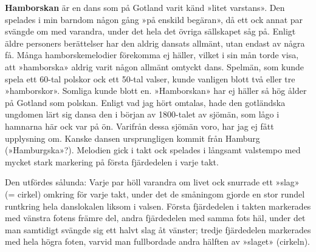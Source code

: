 \thispagestyle{empty}
\vspace*{5cm}
\begin{adjustwidth*}{30mm}{30mm}
\setlength{\parindent}{1.5em}

\textbf{Hamborskan} är en dans som på Gotland varit känd
»litet varstans». Den spelades i min barndom någon gång
»på enskild begäran», då ett ock annat par svängde om med
varandra, under det hela det övriga sällskapet såg på. Enligt
äldre personers berättelser har den aldrig dansats allmänt,
utan endast av några få. Många hamborskemelodier förekomma
ej häller, vilket i sin mån torde visa, att »hamborska»
aldrig varit någon allmänt omtyckt dans. Spelmän,
som kunde spela ett 60-tal polskor ock
ett 50-tal valser, kunde vanligen blott
två eller tre »hamborskor». Somliga kunde blott en. »Hamborskan» har ej
häller så hög ålder på Gotland som polskan. Enligt vad jag hört omtalas,
hade den gotländska ungdomen lärt sig dansa den i början av 1800-talet av sjömän, som lågo i
hamnarna här ock var på ön. Varifrån dessa sjömän voro, har jag ej fått upplysning om.
Kanske dansen ursprungligen kommit från Hamburg (»Hamburgska»?). Melodien gick i 
takt ock spelades i långsamt valstempo med mycket stark markering på första fjärdedelen i varje takt.

Den utfördes sålunda: Varje par höll varandra om livet
ock snurrade ett »slag» (= cirkel) omkring för varje takt,
under det de småningom gjorde en stor rundel runtkring
hela danslokalen liksom i valsen. Första fjärdedelen i takten
markerades med vänstra fotens främre del, andra fjärdedelen
med samma fots häl, under det man samtidigt svängde sig
ett halvt slag åt vänster; tredje fjärdedelen markerades med
hela högra foten, varvid man fullbordade andra hälften av
»slaget» (cirkeln).
\end{adjustwidth*}

